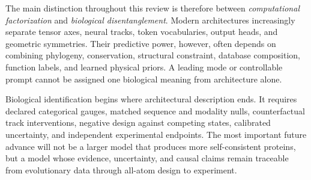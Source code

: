 \documentclass[10pt]{article}
\begin{document}
The main distinction throughout this review is therefore between \emph{computational
factorization} and \emph{biological disentanglement}.  Modern architectures increasingly separate
tensor axes, neural tracks, token vocabularies, output heads, and geometric symmetries.  Their
predictive power, however, often depends on combining phylogeny, conservation, structural
constraint, database composition, function labels, and learned physical priors.  A leading mode or
controllable prompt cannot be assigned one biological meaning from architecture alone.

Biological identification begins where architectural description ends.  It requires declared
categorical gauges, matched sequence and modality nulls, counterfactual track interventions,
negative design against competing states, calibrated uncertainty, and independent experimental
endpoints.  The most important future advance will not be a larger model that produces more
self-consistent proteins, but a model whose evidence, uncertainty, and causal claims remain
traceable from evolutionary data through all-atom design to experiment.
\end{document}
